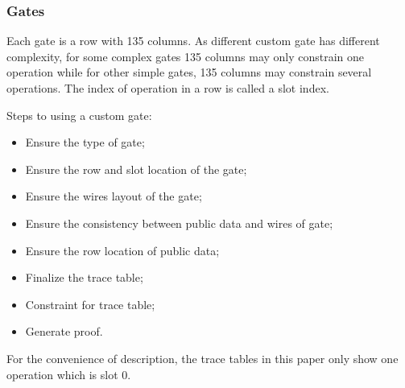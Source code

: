 \subsubsection{Gates} \label{sec:gates}

Each gate is a row with 135 columns. As different custom gate has different complexity, for some complex gates 135 columns may only constrain one
operation while for other simple gates, 135 columns may constrain several operations. The index of operation in a row is called a slot index.

Steps to using a custom gate:
\begin{itemize}
    \item Ensure the type of gate;
    \item Ensure the row and slot location of the gate;
    \item Ensure the wires layout of the gate;
    \item Ensure the consistency between public data and wires of gate;
    \item Ensure the row location of public data;\
    \item Finalize the trace table;
    \item Constraint for trace table;
    \item Generate proof.
\end{itemize}

For the convenience of description, the trace tables in this paper only show one operation which is slot 0.
\subsubsubsection{Custom gates}















